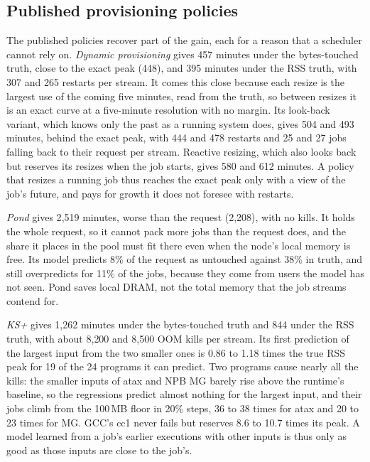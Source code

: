 \documentclass[11pt]{article}
\newcommand{\term}[1]{\emph{#1}}
\begin{document}
\subsection{Published provisioning policies}

The published policies recover part of the gain, each for a reason that a scheduler cannot rely on. \term{Dynamic
provisioning} gives 457 minutes under the bytes-touched truth, close to the exact peak (448), and 395 minutes under the RSS
truth, with 307 and 265 restarts per stream. It comes this close because each resize is the largest use of the coming five
minutes, read from the truth, so between resizes it is an exact curve at a five-minute resolution with no margin. Its
look-back variant, which knows only the past as a running system does, gives 504 and 493 minutes, behind the exact peak,
with 444 and 478 restarts and 25 and 27 jobs falling back to their request per stream. Reactive resizing, which also looks
back but reserves its resizes when the job starts, gives 580 and 612 minutes. A policy that resizes a running job thus
reaches the exact peak only with a view of the job's future, and pays for growth it does not foresee with restarts.

\term{Pond} gives 2{,}519 minutes, worse than the request (2{,}208), with no kills. It holds the whole request, so it cannot
pack more jobs than the request does, and the share it places in the pool must fit there even when the node's local memory
is free. Its model predicts 8\% of the request as untouched against 38\% in truth, and still overpredicts for 11\% of the
jobs, because they come from users the model has not seen. Pond saves local DRAM, not the total memory that the job streams
contend for.

\term{KS+} gives 1{,}262 minutes under the bytes-touched truth and 844 under the RSS truth, with about 8{,}200 and 8{,}500 OOM
kills per stream. Its first prediction of the largest input from the two smaller ones is 0.86 to 1.18 times the true RSS peak
for 19 of the 24 programs it can predict. Two programs cause nearly all the kills: the smaller inputs of atax and NPB MG
barely rise above the runtime's baseline, so the regressions predict almost nothing for the largest input, and their jobs
climb from the 100\,MB floor in 20\% steps, 36 to 38 times for atax and 20 to 23 times for MG. GCC's cc1 never fails but
reserves 8.6 to 10.7 times its peak. A model learned from a job's earlier executions with other inputs is thus only as good
as those inputs are close to the job's.
\end{document}
